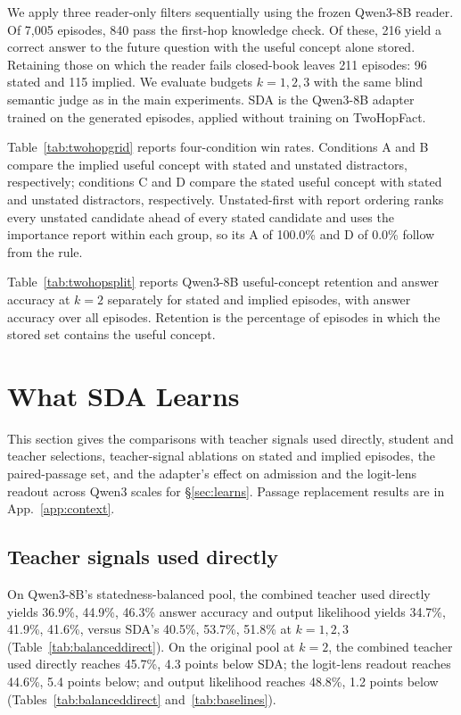 We apply three reader-only filters sequentially using the frozen Qwen3-8B reader. Of 7,005 episodes, 840 pass the first-hop knowledge check. Of these, 216 yield a correct answer to the future question with the useful concept alone stored. Retaining those on which the reader fails closed-book leaves 211 episodes: 96 stated and 115 implied. We evaluate budgets $k=1,2,3$ with the same blind semantic judge as in the main experiments. SDA is the Qwen3-8B adapter trained on the generated episodes, applied without training on TwoHopFact.

Table~\ref{tab:twohopgrid} reports four-condition win rates. Conditions A and B compare the implied useful concept with stated and unstated distractors, respectively; conditions C and D compare the stated useful concept with stated and unstated distractors, respectively. Unstated-first with report ordering ranks every unstated candidate ahead of every stated candidate and uses the importance report within each group, so its A of 100.0\% and D of 0.0\% follow from the rule.


Table~\ref{tab:twohopsplit} reports Qwen3-8B useful-concept retention and answer accuracy at $k=2$ separately for stated and implied episodes, with answer accuracy over all episodes. Retention is the percentage of episodes in which the stored set contains the useful concept.


\FloatBarrier

\section{What SDA Learns}
\label{app:analysis}
\label{app:ablations}

This section gives the comparisons with teacher signals used directly, student and teacher selections, teacher-signal ablations on stated and implied episodes, the paired-passage set, and the adapter's effect on admission and the logit-lens readout across Qwen3 scales for \S\ref{sec:learns}. Passage replacement results are in App.~\ref{app:context}.


\subsection{Teacher signals used directly}
\label{app:direct}
On Qwen3-8B's statedness-balanced pool, the combined teacher used directly yields 36.9\%, 44.9\%, 46.3\% answer accuracy and output likelihood yields 34.7\%, 41.9\%, 41.6\%, versus SDA's 40.5\%, 53.7\%, 51.8\% at $k=1,2,3$ (Table~\ref{tab:balanceddirect}).
On the original pool at $k=2$, the combined teacher used directly reaches 45.7\%, 4.3 points below SDA; the logit-lens readout reaches 44.6\%, 5.4 points below; and output likelihood reaches 48.8\%, 1.2 points below (Tables~\ref{tab:balanceddirect} and~\ref{tab:baselines}).
